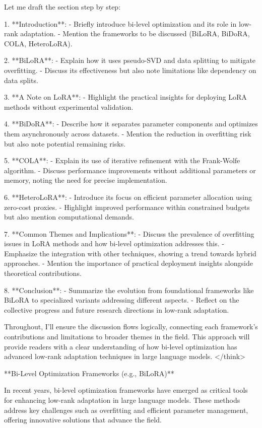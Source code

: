 \documentclass[conference]{IEEEtran}
\begin{document}
Let me draft the section step by step:

1. **Introduction**:
   - Briefly introduce bi-level optimization and its role in low-rank adaptation.
   - Mention the frameworks to be discussed (BiLoRA, BiDoRA, COLA, HeteroLoRA).

2. **BiLoRA**:
   - Explain how it uses pseudo-SVD and data splitting to mitigate overfitting.
   - Discuss its effectiveness but also note limitations like dependency on data splits.

3. **A Note on LoRA**:
   - Highlight the practical insights for deploying LoRA methods without experimental validation.

4. **BiDoRA**:
   - Describe how it separates parameter components and optimizes them asynchronously across datasets.
   - Mention the reduction in overfitting risk but also note potential remaining risks.

5. **COLA**:
   - Explain its use of iterative refinement with the Frank-Wolfe algorithm.
   - Discuss performance improvements without additional parameters or memory, noting the need for precise implementation.

6. **HeteroLoRA**:
   - Introduce its focus on efficient parameter allocation using zero-cost proxies.
   - Highlight improved performance within constrained budgets but also mention computational demands.

7. **Common Themes and Implications**:
   - Discuss the prevalence of overfitting issues in LoRA methods and how bi-level optimization addresses this.
   - Emphasize the integration with other techniques, showing a trend towards hybrid approaches.
   - Mention the importance of practical deployment insights alongside theoretical contributions.

8. **Conclusion**:
   - Summarize the evolution from foundational frameworks like BiLoRA to specialized variants addressing different aspects.
   - Reflect on the collective progress and future research directions in low-rank adaptation.

Throughout, I'll ensure the discussion flows logically, connecting each framework's contributions and limitations to broader themes in the field. This approach will provide readers with a clear understanding of how bi-level optimization has advanced low-rank adaptation techniques in large language models.
</think>

**Bi-Level Optimization Frameworks (e.g., BiLoRA)**

In recent years, bi-level optimization frameworks have emerged as critical tools for enhancing low-rank adaptation in large language models. These methods address key challenges such as overfitting and efficient parameter management, offering innovative solutions that advance the field.
\end{document}
